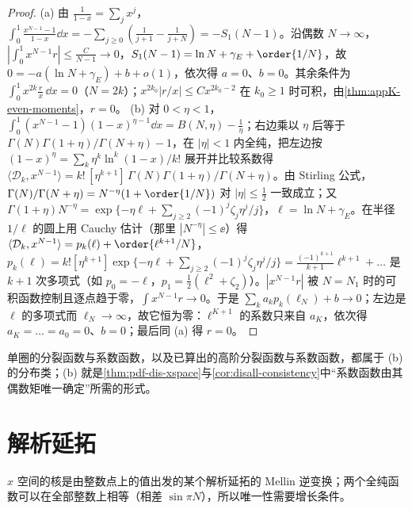 \begin{proof}
(a) 由 $\frac1{1-x}=\sum_jx^j$，$\int_0^1\frac{x^{N-1}-1}{1-x}\dd x=-\sum_{j\ge0}(\frac1{j+1}-\frac1{j+N})=-S_1(N-1)$。沿偶数 $N\to\infty$，$|\int_0^1x^{N-1}r|\le\frac{C}{N-1}\to0$，$S_1(N-1)=\ln N+\gamma_E+\order{1/N}$，故 $0=-a(\ln N+\gamma_E)+b+o(1)$，依次得 $a=0$、$b=0$。其余条件为 $\int_0^1x^{2k}\frac{r}{x}\,\dd x=0$（$N=2k$）；$x^{2k_0}|r/x|\le Cx^{2k_0-2}$ 在 $k_0\ge1$ 时可积，由\cref{thm:appK-even-moments}，$r=0$。
(b) 对 $0<\eta<1$，$\int_0^1(x^{N-1}-1)(1-x)^{\eta-1}\dd x=B(N,\eta)-\frac1\eta$；右边乘以 $\eta$ 后等于 $\Gamma(N)\Gamma(1+\eta)/\Gamma(N+\eta)-1$，在 $|\eta|<1$ 内全纯，把左边按 $(1-x)^\eta=\sum_k\eta^k\ln^k(1-x)/k!$ 展开并比较系数得 $\langle\mathcal D_k,x^{N-1}\rangle=k!\,[\eta^{k+1}]\,\Gamma(N)\Gamma(1+\eta)/\Gamma(N+\eta)$。由 Stirling 公式，$\Gamma(N)/\Gamma(N+\eta)=N^{-\eta}(1+\order{1/N})$ 对 $|\eta|\le\frac12$ 一致成立；又 $\Gamma(1+\eta)N^{-\eta}=\exp\{-\eta\ell+\sum_{j\ge2}(-1)^j\zeta_j\eta^j/j\}$，$\ell=\ln N+\gamma_E$。在半径 $1/\ell$ 的圆上用 Cauchy 估计（那里 $|N^{-\eta}|\le\ee$）得 $\langle\mathcal D_k,x^{N-1}\rangle=p_k(\ell)+\order{\ell^{k+1}/N}$，$p_k(\ell)=k![\eta^{k+1}]\exp\{-\eta\ell+\sum_{j\ge2}(-1)^j\zeta_j\eta^j/j\}=\frac{(-1)^{k+1}}{k+1}\ell^{k+1}+\dots$ 是 $k+1$ 次多项式（如 $p_0=-\ell$，$p_1=\frac12(\ell^2+\zeta_2)$）。$|x^{N-1}r|$ 被 $N=N_1$ 时的可积函数控制且逐点趋于零，$\int x^{N-1}r\to0$。于是 $\sum_ka_kp_k(\ell_N)+b\to0$；左边是 $\ell$ 的多项式而 $\ell_N\to\infty$，故它恒为零：$\ell^{K+1}$ 的系数只来自 $a_K$，依次得 $a_K=\dots=a_0=0$、$b=0$；最后同 (a) 得 $r=0$。
\end{proof}

单圈的分裂函数与系数函数，以及已算出的高阶分裂函数\cite{MochVermaserenVogt2004,VogtMochVermaseren2004}与系数函数\cite{Moch:2004xu,Vermaseren:2005qc}，都属于 (b) 的分布类；(b) 就是\cref{thm:pdf-dis-xspace}与\cref{cor:disall-consistency}中“系数函数由其偶数矩唯一确定”所需的形式。

\section{解析延拓}\label{sec:appK-continuation}

$x$ 空间的核是由整数点上的值出发的某个解析延拓的 Mellin 逆变换；两个全纯函数可以在全部整数上相等（相差 $\sin\pi N$），所以唯一性需要增长条件。

